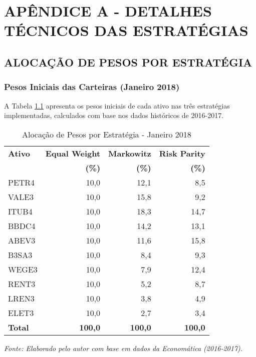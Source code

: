 
\chapter{APÊNDICE A - DETALHES TÉCNICOS DAS ESTRATÉGIAS}

\section{ALOCAÇÃO DE PESOS POR ESTRATÉGIA}

\subsection{Pesos Iniciais das Carteiras (Janeiro 2018)}

A Tabela \ref{tab:pesos_estrategias} apresenta os pesos iniciais de cada ativo nas três estratégias implementadas, calculados com base nos dados históricos de 2016-2017.

\begin{table}[H]
\centering
\caption{Alocação de Pesos por Estratégia - Janeiro 2018}
\begin{tabular}{|l|r|r|r|}
\hline
\textbf{Ativo} & \textbf{Equal Weight} & \textbf{Markowitz} & \textbf{Risk Parity} \\
& \textbf{(\%)} & \textbf{(\%)} & \textbf{(\%)} \\
\hline
PETR4 & 10,0 & 12,1 & 8,5 \\
\hline
VALE3 & 10,0 & 15,8 & 9,2 \\
\hline
ITUB4 & 10,0 & 18,3 & 14,7 \\
\hline
BBDC4 & 10,0 & 14,2 & 13,1 \\
\hline
ABEV3 & 10,0 & 11,6 & 15,8 \\
\hline
B3SA3 & 10,0 & 8,4 & 9,3 \\
\hline
WEGE3 & 10,0 & 7,9 & 12,4 \\
\hline
RENT3 & 10,0 & 5,2 & 8,7 \\
\hline
LREN3 & 10,0 & 3,8 & 4,9 \\
\hline
ELET3 & 10,0 & 2,7 & 3,4 \\
\hline
\textbf{Total} & \textbf{100,0} & \textbf{100,0} & \textbf{100,0} \\
\hline
\end{tabular}

\textit{Fonte: Elaborado pelo autor com base em dados da Economática (2016-2017).}
\label{tab:pesos_estrategias}
\end{table}

